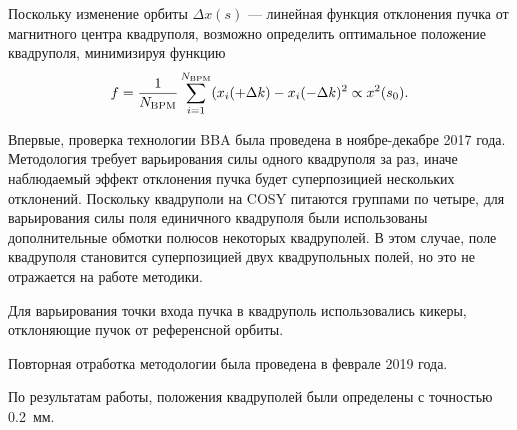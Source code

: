 Поскольку изменение орбиты $\Delta x(s)$ --- линейная функция отклонения пучка от магнитного центра квадруполя, возможно определить оптимальное положение квадруполя, минимизируя функцию
\[
f = \frac{1}{N_{\mathrm{BPM}}}\sum_{i=1}^{N_{\mathrm{BPM}}} (x_i(+\Delta k) -x_i(-\Delta k)^2 \propto x^2(s_0).
\]

Впервые, проверка технологии BBA была проведена в ноябре-декабре 2017 года. Методология требует варьирования силы одного квадруполя за раз, иначе наблюдаемый эффект отклонения пучка будет суперпозицией нескольких отклонений. Поскольку квадруполи на COSY питаются группами по четыре, для варьирования силы поля единичного квадруполя были использованы дополнительные обмотки полюсов некоторых квадруполей. В этом случае, поле квадруполя становится суперпозицией двух квадрупольных полей, но это не отражается на работе методики. 

Для варьирования точки входа пучка в квадруполь использовались кикеры, отклоняющие пучок от референсной орбиты.

Повторная отработка методологии была проведена в феврале 2019 года.

По результатам работы, положения квадруполей были определены с точностью 0.2~мм.~\cite[стр.~182]{YellowReport}